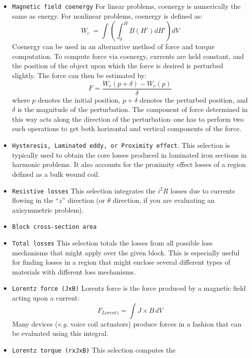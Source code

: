 \documentclass[12pt]{report}
\newcommand{\be}{\begin{equation}}
\newcommand{\ee}{\end{equation}}
\begin{document}
\begin{itemize}
for problems that are linear (at least not heavily saturated).
Denoting $E$ as the energy stored in the magnetic field, inductance
can be obtained by solving the formula:
\be E = \frac{L i^2}{2} \ee
In the case of nonlinear materials, the energy is computed via:
\be W \ = \int \left( \int_0^B H(B') dB' \right) dV \ee
to take proper account of the energy under nonlinear conditions.
\item{\tt Magnetic field coenergy} For linear problems, coenergy
is numerically the same as energy.  For nonlinear problems,
coenergy is defined as:
\be W_c \ = \int \left( \int_0^H B(H') dH' \right) dV \ee
Coenergy can be used in an alternative method of force and torque
computation. To compute force via coenergy, currents are held
constant, and the position of the object upon which the force is
desired is perturbed slightly. The force can then be estimated by:
\be \label{coenergyforce} F=\frac{W_c(p+\delta) - W_c(p)}{\delta} \ee
where $p$ denotes the initial position, $p+\delta$ denotes the
perturbed position, and $\delta$ is the magnitude of the
perturbation.  The component of force determined in this way acts
along the direction of the perturbation--one has to perform two
such operations to get both horizontal and vertical components of
the force.
\item {\tt Hysteresis, Laminated eddy, or Proximity effect}.  This
selection is typically used to obtain the core losses produced in
laminated iron sections in harmonic problems.  It also accounts for the
proximity effect losses of a region defined as a bulk wound coil.
\item {\tt Resistive losses}  This selection integrates the $i^2R$
losses due to currents flowing in the ``$z$'' direction (or
$\theta$ direction, if you are evaluating an axisymmetric problem).
\item {\tt Block cross-section area}
\item {\tt Total losses} This selection totals the losses from all
possible loss mechanisms that might apply over the given block.
This is especially useful for finding losses in a region that might
enclose several different types of materials with different loss
mechanisms.
\item {\tt Lorentz force (JxB)}  Lorentz force is the force
produced by a magnetic field acting upon a current:
\be F_{Lorentz}=\int J \times B \, dV \ee Many
devices ({\em e.g.} voice coil actuators) produce forces in a
fashion that can be evaluated using this integral.
\item {\tt Lorentz torque (rxJxB)}  This selection computes the

\end{itemize}
\end{document}
